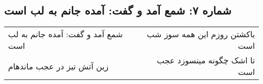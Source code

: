 \begin{center}
\section*{شماره ۷: شمع آمد و گفت: آمده جانم به لب است}
\label{sec:007}
\begin{longtable}{l p{0.5cm} r}
شمع آمد و گفت: آمده جانم به لب است
&&
باکشتن روزم این همه سوز شب است
\\
زین آتش تیز در عجب ماندهام
&&
تا اشک چگونه مینسوزد عجب است
\\
\end{longtable}
\end{center}
